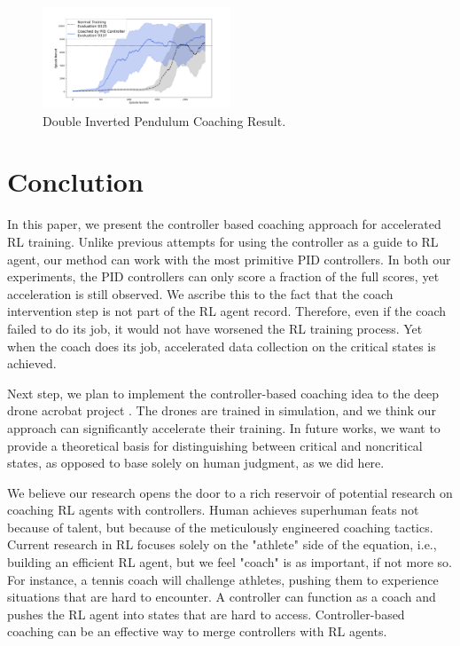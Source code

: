 \documentclass[journal]{IEEEtran}
\begin{document}
\begin{figure}[H]
     \centering
      \includegraphics[width=0.5\textwidth]{double.png}
      \caption{Double Inverted Pendulum Coaching Result.}
      \label{fig:double_result}
\end{figure}



\section{Conclution}

In this paper, we present the controller based coaching approach for accelerated RL training. Unlike previous attempts for using the controller as a guide to RL agent, our method can work with the most primitive PID controllers. In both our experiments, the PID controllers can only score a fraction of the full scores, yet acceleration is still observed. We ascribe this to the fact that the coach intervention step is not part of the RL agent record. Therefore, even if the coach failed to do its job, it would not have worsened the RL training process. Yet when the coach does its job, accelerated data collection on the critical states is achieved. 

Next step, we plan to implement the controller-based coaching idea to the deep drone acrobat project \cite{Kaufmann2020DeepDA}. The drones are trained in simulation, and we think our approach can significantly accelerate their training. In future works, we want to provide a theoretical basis for distinguishing between critical and noncritical states, as opposed to base solely on human judgment, as we did here. 

We believe our research opens the door to a rich reservoir of potential research on coaching RL agents with controllers. Human achieves superhuman feats not because of talent, but because of the meticulously engineered coaching tactics. Current research in RL focuses solely on the "athlete" side of the equation, i.e., building an efficient RL agent, but we feel "coach" is as important, if not more so.  For instance, a tennis coach will challenge athletes, pushing them to experience situations that are hard to encounter. A controller can function as a coach and pushes the RL agent into states that are hard to access. Controller-based coaching can be an effective way to merge controllers with RL agents. 



\end{document}
